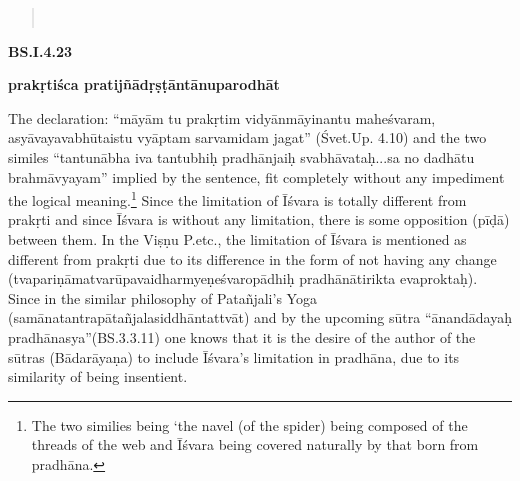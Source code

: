 \textbf{}

\begin{verse}
\\
\end{verse}



\textbf{BS.I.4.23}

\textbf{prakṛtiśca pratijñādṛṣṭāntānuparodhāt}

The  declaration: “māyām tu prakṛtim vidyānmāyinantu maheśvaram, asyāvayavabhūtaistu vyāptam sarvamidam jagat” (Śvet.Up. 4.10) and the two similes “tantunābha iva tantubhiḥ pradhānjaiḥ svabhāvataḥ...\-sa no dadhātu brahmāvyayam” implied by the sentence, fit completely without any impediment the logical meaning.\footnote{The two similies being ‘the navel (of the spider) being composed of the  threads  of the web and Īśvara being covered naturally by that born from pradhāna.} Since the limitation of Īśvara is totally different from prakṛti and since Īśvara is without any limitation, there is some opposition (pīḍā) between them. In the Viṣṇu P.etc., the limitation of Īśvara is mentioned as different from prakṛti due to its difference in the form of not having any change (tvapariṇāmatvarūpavaidharmyeṇeśvaropādhiḥ pradhānātirikta eva\break proktaḥ).  Since in the similar philosophy of Patañjali’s Yoga  (samānatantrapātañjalasiddhāntattvāt) and by the upcoming sūtra “ānandādayaḥ pradhānasya”(BS.3.3.11) one knows that it is the desire of the author of the sūtras (Bādarāyaṇa) to include Īśvara’s limitation in pradhāna, due to its similarity of being insentient.

